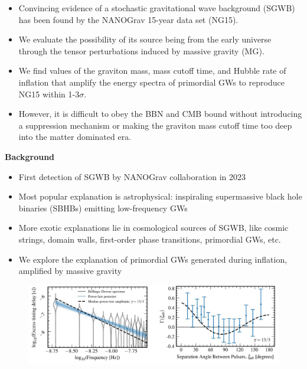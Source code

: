 \documentclass{beamer}                             %
\newcommand{\blocktitle}[1]{{\Large \textbf{#1}}}
\begin{document}
\begin{frame}[t]
\begin{columns}[T]
\begin{column}{0.30\textwidth}
\begin{tcolorbox}
    \begin{itemize}
        \item Convincing evidence of a stochastic gravitational wave background (SGWB) has been found by the NANOGrav 15-year data set (NG15). 
        \item We evaluate the possibility of its source being from the early universe through the tensor perturbations induced by massive gravity (MG). 
        \item We find values of the graviton mass, mass cutoff time, and Hubble rate of inflation that amplify the energy spectra of primordial GWs to reproduce NG15 within 1-3$\sigma$. 
        \item However, it is difficult to obey the BBN and CMB bound without introducing a suppression mechanism or making the graviton mass cutoff time too deep into the matter dominated era.
    \end{itemize}
  \end{tcolorbox}

  \begin{tcolorbox}
    \blocktitle{Background}
    \begin{itemize}
        \item First detection of SGWB by NANOGrav collaboration in 2023 \cite{Agazie:2023}
        \item Most popular explanation is astrophysical: inspiraling supermassive black hole binaries (SBHBs) emitting low-frequency GWs \cite{Burke-Spolaor:2018bvk}
        \item More exotic explanations lie in cosmological sources of SGWB, like cosmic strings, domain walls, first-order phase transitions, primordial GWs, etc. 
        \item We explore the explanation of primordial GWs generated during inflation, amplified by massive gravity 
    \end{itemize}
    \begin{figure}[t]
      \centering
      \includegraphics[width=\linewidth]{ng15.png}  
      \label{fig:ng15}
    \end{figure}
  \end{tcolorbox}


\end{column}
\end{columns}
\end{frame}
\end{document}
